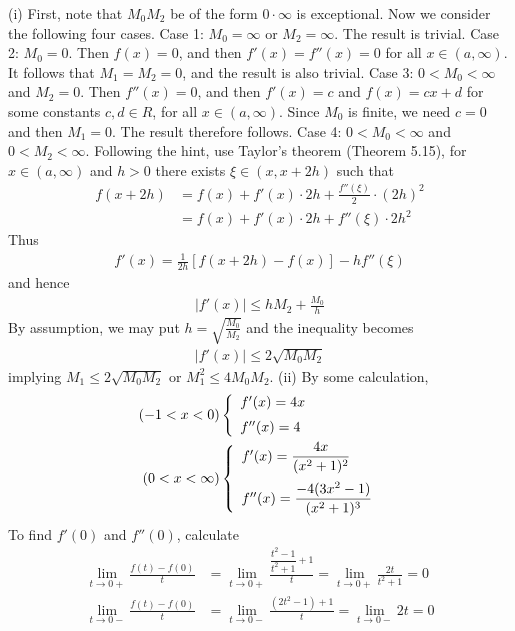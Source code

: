 \documentclass[12pt]{article}
\theoremstyle{definition}
\begin{document}
(i) First, note that $M_0M_2$ be of the form $0\cdot\infty$ is exceptional. Now we consider the following four cases.
Case 1: $M_0=\infty$ or $M_2=\infty$. The result is trivial.
Case 2: $M_0=0$. Then $f(x)=0$, and then $f'(x)=f''(x)=0$ for all $x\in(a,\infty)$. It follows that $M_1=M_2=0$, and the result is also trivial.
Case 3: $0<M_0<\infty$ and $M_2=0$. Then $f''(x)=0$, and then $f'(x)=c$ and $f(x)=cx+d$ for some constants $c,d\in R$, for all $x\in(a,\infty)$. Since $M_0$ is finite, we need $c=0$ and then $M_1=0$. The result therefore follows.
Case 4: $0<M_0<\infty$ and $0<M_2<\infty$. Following the hint, use Taylor's theorem (Theorem 5.15), for $x\in(a,\infty)$ and $h>0$ there exists $\xi\in(x,x+2h)$ such that
\begin{align*}
f(x+2h)
&=f(x)+f'(x)\cdot 2h+\frac{f''(\xi)}{2}\cdot (2h)^2 \\
&=f(x)+f'(x)\cdot 2h+f''(\xi)\cdot 2h^2
\end{align*}
Thus
\begin{align*}
f'(x)=\frac{1}{2h}\left[f(x+2h)-f(x)\right]-hf''(\xi)
\end{align*}
and hence
\begin{align*}
\left\vert f'(x)\right\vert\le hM_2+\frac{M_0}{h}
\end{align*}
By assumption, we may put $h=\sqrt{\frac{M_0}{M_2}}$ and the inequality becomes
\begin{align*}
\left\vert f'(x)\right\vert\le 2\sqrt{M_0M_2}
\end{align*}
implying $M_1\le 2\sqrt{M_0M_2}$ or $M_1^2\le 4M_0M_2$.
(ii) By some calculation,
\begin{align*}
(-1<x<0)&\left\{\begin{array}{l}
f'(x)=4x \vspace{0.08in}\\
f''(x)=4
\end{array}\right. \\
(0<x<\infty)&\left\{\begin{array}{l}
f'(x)=\dfrac{4x}{(x^2+1)^2} \vspace{0.08in}\\
f''(x)=\dfrac{-4(3x^2-1)}{(x^2+1)^3}
\end{array}\right.
\end{align*}
To find $f'(0)$ and $f''(0)$, calculate
\begin{align*}
\lim_{t\to 0+}\frac{f(t)-f(0)}{t}
&=\lim_{t\to 0+}\frac{\dfrac{t^2-1}{t^2+1}+1}{t}
=\lim_{t\to 0+}\frac{2t}{t^2+1}
=0 \\
\lim_{t\to 0-}\frac{f(t)-f(0)}{t}
&=\lim_{t\to 0-}\frac{(2t^2-1)+1}{t}
=\lim_{t\to 0-}2t
=0
\end{align*}
\end{document}
